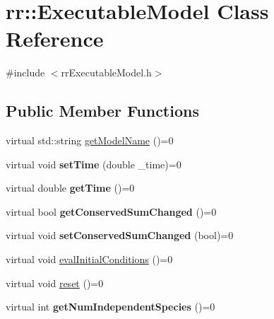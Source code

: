\hypertarget{classrr_1_1_executable_model}{\section{rr\-:\-:Executable\-Model Class Reference}
\label{classrr_1_1_executable_model}
}


{\ttfamily \#include $<$rr\-Executable\-Model.\-h$>$}

\subsection*{Public Member Functions}
\begin{DoxyCompactItemize}
\item 
virtual std\-::string \hyperlink{classrr_1_1_executable_model_a6ad7fd317a2335c337d7c8a3aeb8e044}{get\-Model\-Name} ()=0
\item 
\hypertarget{classrr_1_1_executable_model_ad38c7e2bf987ce1f7cbb8ac7316b8760}{virtual void {\bfseries set\-Time} (double \-\_\-time)=0}\label{classrr_1_1_executable_model_ad38c7e2bf987ce1f7cbb8ac7316b8760}

\item 
\hypertarget{classrr_1_1_executable_model_a9f4ae8c898f3c1553377b0f90b96c8e4}{virtual double {\bfseries get\-Time} ()=0}\label{classrr_1_1_executable_model_a9f4ae8c898f3c1553377b0f90b96c8e4}

\item 
\hypertarget{classrr_1_1_executable_model_a78d7c7496f2452280933a50057d2cda4}{virtual bool {\bfseries get\-Conserved\-Sum\-Changed} ()=0}\label{classrr_1_1_executable_model_a78d7c7496f2452280933a50057d2cda4}

\item 
\hypertarget{classrr_1_1_executable_model_a2294de2848a8411d7dacd62caeb8963e}{virtual void {\bfseries set\-Conserved\-Sum\-Changed} (bool)=0}\label{classrr_1_1_executable_model_a2294de2848a8411d7dacd62caeb8963e}

\item 
virtual void \hyperlink{classrr_1_1_executable_model_ae87772afeacb710067c2dd7a53106694}{eval\-Initial\-Conditions} ()=0
\item 
virtual void \hyperlink{classrr_1_1_executable_model_a217c61819d9b029c5928ace53b805e89}{reset} ()=0
\item 
\hypertarget{classrr_1_1_executable_model_af347779e832d6eaa7c263023b8d16739}{virtual int {\bfseries get\-Num\-Independent\-Species} ()=0}\label{classrr_1_1_executable_model_af347779e832d6eaa7c263023b8d16739}


\end{DoxyCompactItemize}

